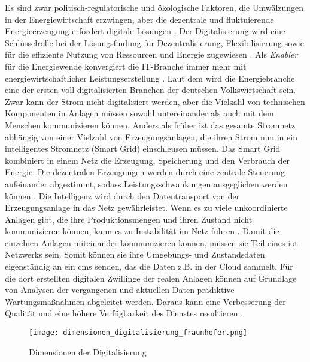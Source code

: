 \noindent Es sind zwar politisch-regulatorische und ökologische Faktoren, die Umwälzungen in der Energiewirtschaft erzwingen, aber die dezentrale und fluktuierende Energieerzeugung erfordert digitale Lösungen \citep{Doleski2017}. Der Digitalisierung wird eine Schlüsselrolle bei der Lösungsfindung für Dezentralisierung, Flexibilisierung sowie für die effiziente Nutzung von Ressourcen und Energie zugewiesen \citep{FraunhoferISE}. Als \textit{Enabler} für die Energiewende konvergiert die IT-Branche immer mehr mit energiewirtschaftlicher Leistungserstellung \citep{Doleski2015}. Laut dem \citet{BWE2015} wird die Energiebranche eine der ersten voll digitalisierten Branchen der deutschen Volkswirtschaft sein. Zwar kann der Strom nicht digitalisiert werden, aber die Vielzahl von technischen Komponenten in Anlagen müssen sowohl untereinander als auch mit dem Menschen kommunizieren können. Anders als früher ist das gesamte Stromnetz abhängig von einer Vielzahl von Erzeugungsanlagen, die ihren Strom nun in ein intelligentes Stromnetz (Smart Grid) einschleusen müssen. Das Smart Grid kombiniert in einem Netz die Erzeugung, Speicherung und den Verbrauch der Energie. Die dezentralen Erzeugungen werden durch eine zentrale Steuerung aufeinander abgestimmt, sodass Leistungsschwankungen ausgeglichen werden können \citep{Krone2017}. Die Intelligenz wird durch den Datentransport von der Erzeugungsanlage in das Netz gewährleistet. Wenn es zu viele unkoordinierte Anlagen gibt, die ihre Produktionsmengen und ihren Zustand nicht kommunizieren können, kann es zu Instabilität im Netz führen \citep{Umweltbundesamt2018}. Damit die einzelnen Anlagen miteinander kommunizieren können, müssen sie Teil eines \ac{iot}-Netzwerks sein. Somit können sie ihre Umgebungs- und Zustandsdaten eigenständig an ein \acf{cms} senden, das die Daten z.B. in der Cloud sammelt. Für die dort erstellten digitalen Zwillinge der realen Anlagen können auf Grundlage von Analysen der vergangenen und aktuellen Daten prädiktive Wartungsmaßnahmen abgeleitet werden. Daraus kann eine Verbesserung der Qualität und eine höhere Verfügbarkeit des Dienstes resultieren \citep{Utecht2018}.

\begin{figure}[h]
  \texttt{[image: dimensionen\_digitalisierung\_fraunhofer.png]}
  \caption[Dimensionen der Digitalisierung]{Dimensionen der Digitalisierung \citep{FraunhoferISE}}
  \label{dimensionen}
\end{figure}

